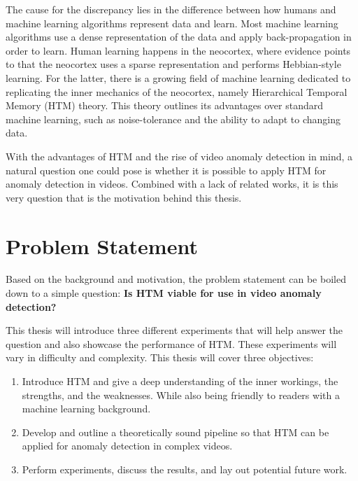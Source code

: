 The cause for the discrepancy lies in the difference between how humans and machine learning algorithms represent data and learn. Most machine learning algorithms use a dense representation of the data and apply back-propagation in order to learn. Human learning happens in the neocortex, where evidence points to that the neocortex uses a sparse representation and performs Hebbian-style learning. For the latter, there is a growing field of machine learning dedicated to replicating the inner mechanics of the neocortex, namely Hierarchical Temporal Memory (HTM) theory. This theory outlines its advantages over standard machine learning, such as noise-tolerance and the ability to adapt to changing data.
\par
With the advantages of HTM and the rise of video anomaly detection in mind, a natural question one could pose is whether it is possible to apply HTM for anomaly detection in videos. Combined with a lack of related works, it is this very question that is the motivation behind this thesis.
\section{Problem Statement}
Based on the background and motivation, the problem statement can be boiled down to a simple question: \textbf{Is HTM viable for use in video anomaly detection?}\par
This thesis will introduce three different experiments that will help answer the question and also showcase the performance of HTM. These experiments will vary in difficulty and complexity. This thesis will cover three objectives:
\begin{enumerate}
    \item Introduce HTM and give a deep understanding of the inner workings, the strengths, and the weaknesses. While also being friendly to readers with a machine learning background.
    \item Develop and outline a theoretically sound pipeline so that HTM can be applied for anomaly detection in complex videos.
    \item Perform experiments, discuss the results, and lay out potential future work.
\end{enumerate}
